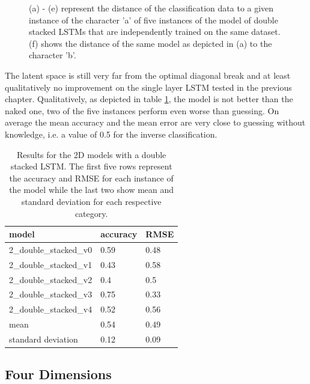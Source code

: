 \begin{figure}[!htb]
\begin{tabular}{ccc}
	\end{tabular}
	\caption{ (a) - (e) represent the distance of the classification data to a given instance of the character 'a' of five instances of the model of double stacked LSTMs that are independently trained on the same dataset. (f) shows the distance of the same model as depicted in (a) to the character 'b'. }
	\label{fig:2_ds}
\end{figure}

The latent space is still very far from the optimal diagonal break and at least qualitatively no improvement on the single layer LSTM tested in the previous chapter. Qualitatively, as depicted in table \ref{table:2_ds}, the model is not better than the naked one, two of the five instances perform even worse than guessing. On average the mean accuracy and the mean error are very close to guessing without knowledge, i.e. a value of 0.5 for the inverse classification.

\begin{table}[!htb]
	\centering
	\caption{Results for the 2D models with a double stacked LSTM. The first five rows represent the accuracy and RMSE for each instance of the model while the last two show mean and standard deviation for each respective category.}
	\begin{tabularx}{\textwidth}{ X  X  X }
		\hline
		model & accuracy & RMSE \\ 
		\hline
		2\_double\_stacked\_v0 & 0.59 & 0.48 \\
		2\_double\_stacked\_v1 & 0.43 & 0.58 \\
		2\_double\_stacked\_v2 & 0.4 &  0.5 \\
        2\_double\_stacked\_v3 & 0.75 & 0.33 \\
		2\_double\_stacked\_v4 & 0.52 & 0.56 \\
		\hline 
		mean & 0.54 & 0.49 \\
		standard deviation & 0.12 & 0.09 \\
		\hline
	\end{tabularx}
	\label{table:2_ds}
\end{table}


\subsection{Four Dimensions}

